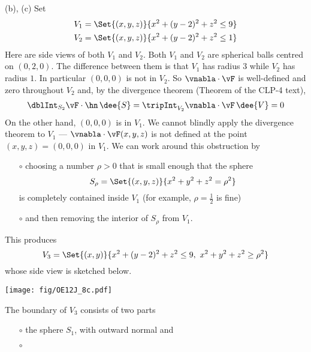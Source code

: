 \begin{solution}
(b), (c) Set
\begin{align*}
V_1 &= \Set{(x,y,z)}{x^2 + (y - 2)^2 + z^2 \le 9} \\
V_2 &= \Set{(x,y,z)}{x^2 + (y - 2)^2 + z^2 \le 1} 
\end{align*}
Here are side views of both $V_1$ and $V_2$.
%
Both $V_1$ and $V_2$ are spherical balls centred on $(0,2,0)$.
The difference between them is that $V_1$ has radius $3$ while $V_2$
has radius $1$. In particular $(0,0,0)$ is not in $V_2$. So $\vnabla\cdot\vF$ is 
well-defined and zero throughout $V_2$ and, by the divergence theorem
(Theorem  of the CLP-4 text),
\begin{align*}
\dblInt_{S_2} \vF\cdot\hn\,\dee{S}
=\tripInt_{V_2} \vnabla\cdot\vF\,\dee{V}
=0
\end{align*}
On the other hand, $(0,0,0)$ is in $V_1$. We cannot blindly apply the divergence
theorem to $V_1$ --- $\vnabla\cdot\vF(x,y,z)$ is not defined at the point
$(x,y,z)=(0,0,0)$ in $V_1$. We can work around this obstruction
by 
\begin{itemize}\itemsep1pt \parskip0pt  %
\item[$\circ$]
choosing a number $\rho>0$ that is small enough that the sphere
\begin{equation*}
S_\rho = \Set{(x,y,z)}{x^2+y^2+z^2=\rho^2}
\end{equation*}
is completely contained inside $V_1$ (for example, $\rho=\frac{1}{2}$ is fine)
\item[$\circ$]
and then removing the interior of $S_\rho$ from $V_1$. 
\end{itemize}
This produces
\begin{equation*}
V_3 = \Set{(x,y)}{x^2 + (y - 2)^2 + z^2 \le 9,\ x^2+y^2+z^2\ge\rho^2}
\end{equation*}
whose side view is sketched below.
 \begin{center}
    \texttt{[image: fig/OE12J\_8c.pdf]}
\end{center}
The boundary of $V_3$ consists of two parts
\begin{itemize}\itemsep1pt \parskip0pt  %
\item[$\circ$]
the sphere $S_1$, with outward normal and
\item[$\circ$]

\end{itemize}
\end{solution}
